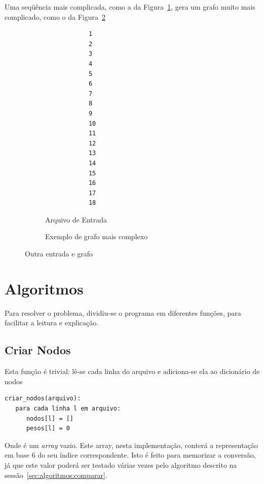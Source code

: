 \documentclass[12pt]{article}
\begin{document}
Uma seqüência mais complicada, como a da Figura~\ref{fig:testebobo:entrada}, gera um grafo muito mais complicado, como o da Figura~\ref{fig:testebobo:grafo}
\begin{figure}[H]
  \begin{minipage}[t]{0.3\columnwidth}
    \begin{figure}
        \begin{lstlisting}
            1
            2
            3
            4
            5
            6
            7
            8
            9
            10
            11
            12
            13
            14
            15
            16
            17
            18
        \end{lstlisting}
      \caption{Arquivo de Entrada}
      \label{fig:testebobo:entrada}
    \end{figure}
  \end{minipage}%
  \begin{minipage}[t][1\totalheight][b]{0.65\textwidth}%
    \begin{figure}[h!]
    \begin{dot2tex}[neato,options=-tmath]
        
    \end{dot2tex}
    \caption{Exemplo de grafo mais complexo}
    \label{fig:testebobo:grafo}
    \end{figure}
  \end{minipage}
  \caption{Outra entrada e grafo}
  \label{fig:testebobo}
\end{figure}


\section{Algoritmos}\label{sec:algoritmos}
Para resolver o problema, dividiu-se o programa em diferentes fun\c{c}ões, para facilitar a leitura e explica\c{c}ão.

\subsection{Criar Nodos}\label{sec:algoritmos:criar-nodos}
Esta fun\c{c}ão é trivial: lê-se cada linha do arquivo e adiciona-se ela ao dicionário de nodos
\begin{lstlisting}
criar_nodos(arquivo):
   para cada linha l em arquivo:
      nodos[l] = []
      pesos[l] = 0
\end{lstlisting}

Onde {\sf []} é um \textit{array} vazio. Este array, nesta implementa\c{c}ão, conterá a representa\c{c}ão em base 6 do seu índice correspondente. Isto é feito para memorizar a conversão, já que este valor poderá ser testado várias vezes pelo algoritmo descrito na sessão~\ref{sec:algoritmos:comparar}.
\end{document}

